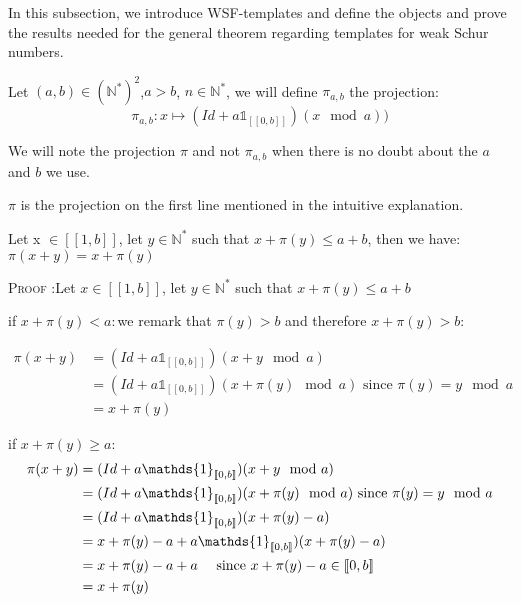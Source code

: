 \qquad In this subsection, we introduce WSF-templates and define the objects and prove the results needed
for the general theorem regarding templates for weak Schur numbers.

\begin{definition}

Let \((a,b) \in (\mathbb{N}^*)^2\),\(a>b\), \(n \in \mathbb{N}^*\), we will define \(\pi_{a,b}\) the projection:
\[ \pi_{a,b}:x \longmapsto (Id+a\mathds{1}_{ [\![0,b]\!]})(x \mod a))\]
\end{definition}

We will note  the projection \(\pi\) and not \(\pi_{a,b}\) when there is no doubt about the \(a\) and \(b\) we use.

\begin{remark}
\(\pi\) is the projection on the first line mentioned in the intuitive explanation.
\end{remark}

\begin{proposition}
Let x \(\in [\![1,b]\!]\), let  \(y \in \mathbb{N}^*\) such that \(x+\pi(y)\leqslant a+b\), then we have: \(\pi(x+y)=x+\pi(y)\)
\end{proposition}

\textsc{Proof :}Let  \(x\in [\![1,b]\!]\), let  \(y\in \mathbb{N}^*\) such that \(x+\pi(y)\leqslant a+b\)

if \(x+\pi(y)< a:\)we remark that \(\pi(y)>b\) and therefore \(x+\pi(y)>b\):

\begin{align*}
 \pi(x+y) & = (Id+a\mathds{1}_{ [\![0,b]\!]})(x+y \mod a)\\
& = (Id+a\mathds{1}_{ [\![0,b]\!]})(x+\pi(y) \mod a)\text{ since } \pi(y)=y \mod a \\
& =x+ \pi(y)
\end{align*}

if \(x+\pi(y)\geqslant a\):
\begin{align*}
 \pi(x+y) & = (Id+a\mathds{1}_{ [\![0,b]\!]})(x+y \mod a)\\
& = (Id+a\mathds{1}_{ [\![0,b]\!]})(x+\pi(y)\mod a)\text{ since } \pi(y)=y \mod a \\
& = (Id+a\mathds{1}_{ [\![0,b]\!]})(x+\pi(y) - a) \\
& = x+\pi(y) - a +a\mathds{1}_{ [\![0,b]\!]})(x+\pi(y) - a) \\
& = x+\pi(y) - a +a \text{ \quad since } x+\pi(y) - a \in [\![0,b]\!] \\
& = x+\pi(y)
\end{align*}


